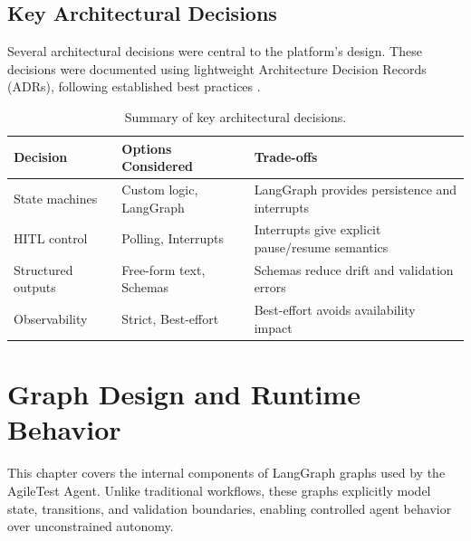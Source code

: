 \section{Key Architectural Decisions}
\label{sec:KeyArchDecisions}

Several architectural decisions were central to the platform’s design. These
decisions were documented using lightweight Architecture Decision Records
(ADRs), following established best practices \cite{nygard2011adr}.

\begin{table}[htbp]
    \centering
    \caption{Summary of key architectural decisions.}
    \label{tab:ADRSummary}
    \begin{tabular}{lp{4cm}p{5cm}}
        \toprule
        \textbf{Decision}  & \textbf{Options Considered} & \textbf{Trade-offs}                             \\
        \midrule
        State machines     & Custom logic, LangGraph     & LangGraph provides persistence and interrupts   \\
        HITL control       & Polling, Interrupts         & Interrupts give explicit pause/resume semantics \\
        Structured outputs & Free-form text, Schemas     & Schemas reduce drift and validation errors      \\
        Observability      & Strict, Best-effort         & Best-effort avoids availability impact          \\
        \bottomrule
    \end{tabular}
\end{table}

\chapter{Graph Design and Runtime Behavior}
\label{ch:GraphDesign}

This chapter covers the internal components of LangGraph graphs used by the
AgileTest Agent. Unlike traditional workflows, these graphs explicitly model
state, transitions, and validation boundaries, enabling controlled agent
behavior over unconstrained autonomy.

